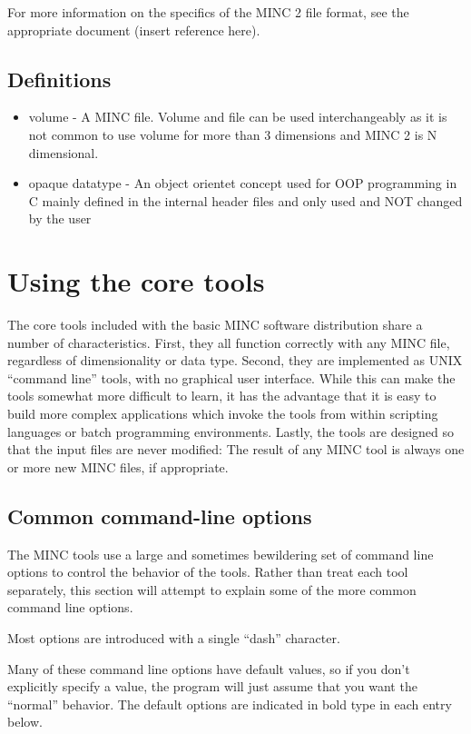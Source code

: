 \documentclass{article}
\begin{document}
For more information on the specifics of the MINC 2 file format, see the
appropriate document (insert reference here).

\subsection{Definitions}
\begin{itemize}
\item volume - A MINC file. Volume and file can be used interchangeably
as it is not common to use volume for more than
3 dimensions and MINC 2 is N dimensional.

\item opaque datatype - An object orientet concept used for OOP 
programming in C mainly defined in the internal header files and only 
used and NOT changed by the user
\end{itemize}
\newpage
\section{Using the core tools}
The core tools included with the basic MINC software distribution
share a number of characteristics.  First, they all function correctly
with any MINC file, regardless of dimensionality or data type.
Second, they are implemented as UNIX ``command line'' tools, with no
graphical user interface.  While this can make the tools somewhat more
difficult to learn, it has the advantage that it is easy to build more
complex applications which invoke the tools from within scripting
languages or batch programming environments.  Lastly, the tools are
designed so that the input files are never modified: The result of any
MINC tool is always one or more new MINC files, if appropriate.

\subsection{Common command-line options}
The MINC tools use a large and sometimes bewildering set of command line
options to control the behavior of the tools.  Rather than treat
each tool separately, this section will attempt to explain some of the 
more common command line options.

Most options are introduced with a single ``dash'' character.

Many of these command line options have default values, so if you 
don't explicitly specify a value, the program will just assume that
you want the ``normal'' behavior.  The default options are indicated
in bold type in each entry below.
\end{document}
